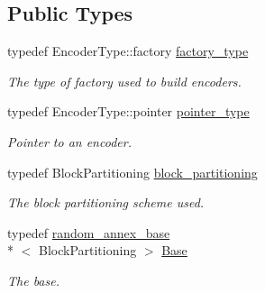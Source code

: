 \subsection*{Public Types}
\begin{DoxyCompactItemize}
\item 
\hypertarget{classkodo_1_1random__annex__encoder_a4e1a6314555e2254cb60c6825897b2fe}{typedef Encoder\-Type\-::factory \hyperlink{classkodo_1_1random__annex__encoder_a4e1a6314555e2254cb60c6825897b2fe}{factory\-\_\-type}}\label{classkodo_1_1random__annex__encoder_a4e1a6314555e2254cb60c6825897b2fe}

\begin{DoxyCompactList}\small\item\em The type of factory used to build encoders. \end{DoxyCompactList}\item 
\hypertarget{classkodo_1_1random__annex__encoder_a63968d8f239e61728f22bffddcb26ea4}{typedef Encoder\-Type\-::pointer \hyperlink{classkodo_1_1random__annex__encoder_a63968d8f239e61728f22bffddcb26ea4}{pointer\-\_\-type}}\label{classkodo_1_1random__annex__encoder_a63968d8f239e61728f22bffddcb26ea4}

\begin{DoxyCompactList}\small\item\em Pointer to an encoder. \end{DoxyCompactList}\item 
\hypertarget{classkodo_1_1random__annex__encoder_ab2b24b30ee4f344deed12ffa1d654131}{typedef Block\-Partitioning \hyperlink{classkodo_1_1random__annex__encoder_ab2b24b30ee4f344deed12ffa1d654131}{block\-\_\-partitioning}}\label{classkodo_1_1random__annex__encoder_ab2b24b30ee4f344deed12ffa1d654131}

\begin{DoxyCompactList}\small\item\em The block partitioning scheme used. \end{DoxyCompactList}\item 
\hypertarget{classkodo_1_1random__annex__encoder_a9639938f36a0ce2817e49f1b23cab365}{typedef \hyperlink{classkodo_1_1random__annex__base}{random\-\_\-annex\-\_\-base}\\*
$<$ Block\-Partitioning $>$ \hyperlink{classkodo_1_1random__annex__encoder_a9639938f36a0ce2817e49f1b23cab365}{Base}}\label{classkodo_1_1random__annex__encoder_a9639938f36a0ce2817e49f1b23cab365}

\begin{DoxyCompactList}\small\item\em The base. \end{DoxyCompactList}\end{DoxyCompactItemize}

